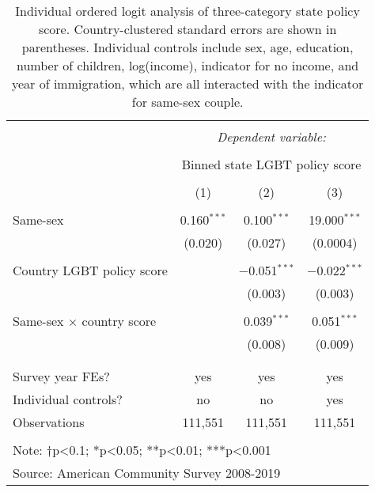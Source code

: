 \documentclass[
  11pt,
]{article}
\begin{document}
\begin{table}[!htbp] \centering 
  \caption{Individual ordered logit analysis of three-category state policy score. Country-clustered standard errors are shown in parentheses. Individual controls include sex, age, education, number of children, log(income), indicator for no income, and year of immigration, which are all interacted with the indicator for same-sex couple.} 
  \label{tab:ord} 
\begin{tabular}{@{\extracolsep{5pt}}lccc} 
\\[-1.8ex]\hline 
\hline \\[-1.8ex] 
 & \multicolumn{3}{c}{\textit{Dependent variable:}} \\ 
\cline{2-4} 
\\[-1.8ex] & \multicolumn{3}{c}{Binned state LGBT policy score} \\ 
\\[-1.8ex] & (1) & (2) & (3)\\ 
\hline \\[-1.8ex] 
 Same-sex & 0.160$^{***}$ & 0.100$^{***}$ & 19.000$^{***}$ \\ 
  & (0.020) & (0.027) & (0.0004) \\ 
  & & & \\ 
 Country LGBT policy score &  & $-$0.051$^{***}$ & $-$0.022$^{***}$ \\ 
  &  & (0.003) & (0.003) \\ 
  & & & \\ 
 Same-sex × country score &  & 0.039$^{***}$ & 0.051$^{***}$ \\ 
  &  & (0.008) & (0.009) \\ 
  & & & \\ 
\hline \\[-1.8ex] 
Survey year FEs? & yes & yes & yes \\ 
Individual controls? & no & no & yes \\ 
Observations & 111,551 & 111,551 & 111,551 \\ 
\hline 
\hline \\[-1.8ex] 
\multicolumn{4}{l}{Note: †p<0.1; *p<0.05; **p<0.01; ***p<0.001} \\ 
\multicolumn{4}{l}{Source: American Community Survey 2008-2019} \\ 
\end{tabular} 
\end{table}
\end{document}
